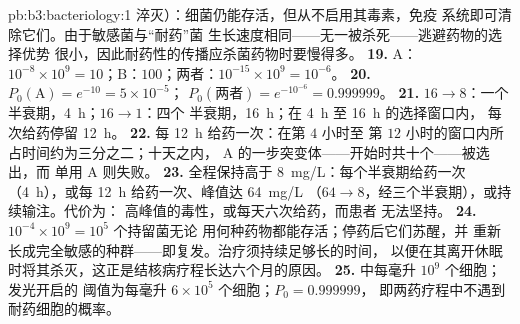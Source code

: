 \begin{solution}{pb:b3:bacteriology:1}
淬灭）：细菌仍能存活，但从不启用其毒素，免疫
系统即可清除它们。由于敏感菌与“耐药”菌
生长速度相同——无一被杀死——逃避药物的选择优势
很小，因此耐药性的传播应杀菌药物时要慢得多。
\textbf{19.} A：$10^{-8}\times 10^{9} = 10$；B：$100$；两者：$10^{-15}\times
10^{9} = 10^{-6}$。
\textbf{20.} $P_{0}(\text{A}) = e^{-10} = 5\times 10^{-5}$；
$P_{0}(\text{两者}) = e^{-10^{-6}} = 0.999999$。
\textbf{21.} $16 \to 8$：一个半衰期，\qty{4}{h}；$16 \to 1$：四个
半衰期，\qty{16}{h}；在 \qty{4}{h} 至 \qty{16}{h} 的选择窗口内，
每次给药停留 \qty{12}{h}。
\textbf{22.} 每 \qty{12}{h} 给药一次：在第 $4$ 小时至
第 $12$ 小时的窗口内所占时间约为三分之二；十天之内，
A 的一步突变体——开始时共十个——被选出，而
单用 A 则失败。
\textbf{23.} 全程保持高于 \qty{8}{mg/L}：每个半衰期给药一次
（\qty{4}{h}），或每 \qty{12}{h} 给药一次、峰值达 \qty{64}{mg/L}
（$64 \to 8$，经三个半衰期），或持续输注。代价为：
高峰值的毒性，或每天六次给药，而患者
无法坚持。
\textbf{24.} $10^{-4}\times 10^{9} = 10^{5}$ 个持留菌无论
用何种药物都能存活；停药后它们苏醒，并
重新长成完全敏感的种群——即复发。治疗须持续足够长的时间，
以便在其离开休眠时将其杀灭，这正是结核病疗程长达六个月的原因。
\textbf{25.} 中每毫升 $10^{9}$ 个细胞；发光开启的
阈值为每毫升 $6\times 10^{5}$ 个细胞；$P_{0} = 0.999999$，
即两药疗程中不遇到耐药细胞的概率。
\end{solution}
